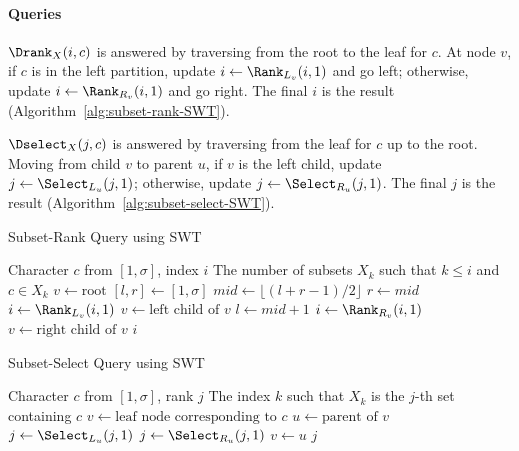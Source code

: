 \paragraph{Queries}
$\Drank_X(i, c)$ is answered by traversing from the root to the leaf for $c$. At node $v$, if $c$ is in the left partition, update $i \leftarrow \Rank_{L_v}(i, 1)$ and go left; otherwise, update $i \leftarrow \Rank_{R_v}(i, 1)$ and go right. The final $i$ is the result (Algorithm~\ref{alg:subset-rank-SWT}).

$\Dselect_X(j, c)$ is answered by traversing from the leaf for $c$ up to the root. Moving from child $v$ to parent $u$, if $v$ is the left child, update $j \leftarrow \Select_{L_u}(j, 1)$; otherwise, update $j \leftarrow \Select_{R_u}(j, 1)$. The final $j$ is the result (Algorithm~\ref{alg:subset-select-SWT}).


\begin{algorithm}[hbtp]
    \caption{Subset-Rank Query using SWT {\cite[cf.][]{SubsetWT}}}
    \label{alg:subset-rank-SWT}
    \begin{algorithmic}[1] %
        \Require Character $c$ from $[1, \sigma]$, index $i$
        \Ensure The number of subsets $X_k$ such that $k \leq i$ and $c \in X_k$
        \State $v \gets \text{root}$
        \State $[l, r] \gets [1, \sigma]$ 
        \State $mid \gets \lfloor (l+r-1)/2 \rfloor$
        \State $r \gets mid$
        \State $i \gets \Rank_{L_v}(i, 1)$ 
        \State $v \gets \text{left child of } v$
        \Else
        \State $l \gets mid + 1$
        \State $i \gets \Rank_{R_v}(i, 1)$ 
        \State $v \gets \text{right child of } v$
        \EndIf
        \EndWhile
        \State \Return $i$
        \EndFunction
    \end{algorithmic}
\end{algorithm}

\begin{algorithm}[hbtp]
    \caption{Subset-Select Query using SWT {\cite[cf.][]{SubsetWT}}}
    \label{alg:subset-select-SWT}
    \begin{algorithmic}[1] %
        \Require Character $c$ from $[1, \sigma]$, rank $j$
        \Ensure The index $k$ such that $X_k$ is the $j$-th set containing $c$
        \State $v \gets \text{leaf node corresponding to } c$
        \State $u \gets \text{parent of } v$
        \State $j \gets \Select_{L_u}(j, 1)$ 
        \Else
        \State $j \gets \Select_{R_u}(j, 1)$ 
        \EndIf
        \State $v \gets u$
        \EndWhile
        \State \Return $j$
        \EndFunction
    \end{algorithmic}
\end{algorithm}

